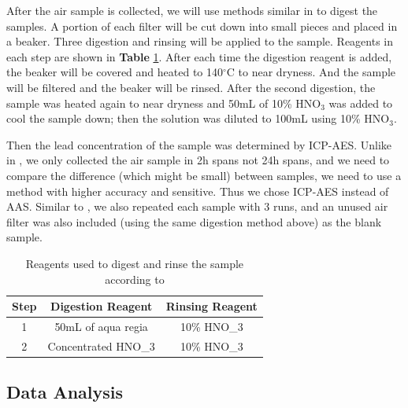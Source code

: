 \documentclass[12pt]{article}
\begin{document}
After the air sample is collected, we will use methods similar in \cite{gharaibeh_determination_2010} to digest the samples. A portion of each filter will be cut down into small pieces and placed in a beaker. Three digestion and rinsing will be applied to the sample. Reagents in each step are shown in \textbf{Table} \ref{tab:steps}. After each time the digestion reagent is added, the beaker will be covered and heated to 140$^{\circ}$C to near dryness. And the sample will be filtered and the beaker will be rinsed. After the second digestion, the sample was heated again to near dryness and 50mL of 10\% HNO$_{3}$ was added to cool the sample down; then the solution was diluted to 100mL using 10\% HNO$_{3}$. \cite{gharaibeh_determination_2010}

Then the lead concentration of the sample was determined by ICP-AES. Unlike in \cite{gharaibeh_determination_2010}, we only collected the air sample in 2h spans not 24h spans, and we need to compare the difference (which might be small) between samples, we need to use a method with higher accuracy and sensitive. Thus we chose ICP-AES instead of AAS. Similar to \cite{gharaibeh_determination_2010}, we also repeated each sample with 3 runs, and an unused air filter was also included (using the same digestion method above) as the blank sample. 

\begin{table}[]
    \centering
    \begin{tabular}{|c|c|c|}
    \hline
    Step & Digestion Reagent & Rinsing Reagent \\ \hline
    1 & 50mL of aqua regia & 10\% HNO_{3} \\ \hline
    2 & Concentrated HNO_{3} & 10\% HNO_{3} \\ \hline 
    \end{tabular}
    \caption{Reagents used to digest and rinse the sample according to \cite{gharaibeh_determination_2010}}
    \label{tab:steps}
\end{table}
\subsection{Data Analysis}
\end{document}
